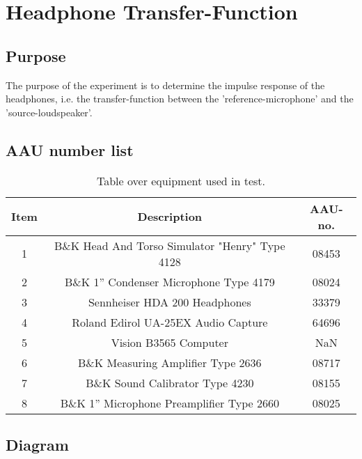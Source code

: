 \section{Headphone Transfer-Function} \label{sec:HPjournal}
\subsection{Purpose}
The purpose of the experiment is to determine the impulse response of the  headphones, i.e. the transfer-function between the 'reference-microphone' and the 'source-loudspeaker'.

\subsection{AAU number list}
\begin{table}[H]
	\centering
	\begin{tabular}{ c c c } \toprule
		{Item}	& {Description} 						& {AAU-no}. \\ \bottomrule 
		1	&	B\&K Head And Torso Simulator "Henry" Type 4128	& 08453		\\
		2	&	B\&K 1'' Condenser Microphone Type 4179 & 08024\\
		3	&	Sennheiser HDA 200	Headphones			& 33379		\\
		4	&	Roland Edirol UA-25EX Audio Capture		& 64696		\\
		5	&	Vision B3565 Computer					& NaN		\\
		6	&	B\&K Measuring Amplifier Type 2636	& 08717		\\
		7	&	B\&K Sound Calibrator Type 4230			& 08155		\\ 
		8	&	B\&K 1'' Microphone Preamplifier Type 2660	& 08025		\\
		\bottomrule
	\end{tabular}
	\caption{Table over equipment used in test.}
	\label{tab:UsedEquipmentListningHP}
\end{table}

\subsection{Diagram}



